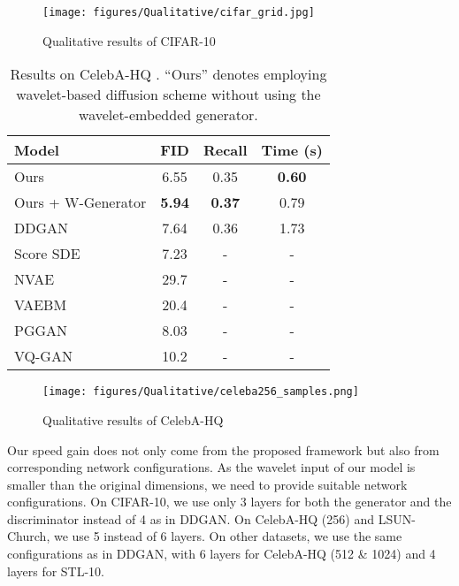 \documentclass[10pt,twocolumn,letterpaper]{article}
\begin{document}
\begin{figure}[t]
  \centering
\texttt{[image: figures/Qualitative/cifar\_grid.jpg]}
    \vspace{-2mm}
   \caption{Qualitative results of CIFAR-10 }
   \label{fig:cifar_samples}
    \vspace{-1mm}
\end{figure}



\begin{table}[t]
  \centering
\begin{tabular}{l c c c}
    \toprule
    Model & FID & Recall & Time (s) \\
    \midrule
    Ours & 6.55 & 0.35 & \textbf{0.60} \\
    Ours + W-Generator & \textbf{5.94} & \textbf{0.37} & 0.79 \\
    DDGAN \cite{xiao2021tackling} & 7.64 & 0.36 & 1.73 \\
    \midrule
    Score SDE \cite{song2020score} & 7.23 & - & - \\
NVAE \cite{vahdat2020nvae} & 29.7 & - & - \\
    VAEBM \cite{xiao2021vaebm} & 20.4 & - & - \\
PGGAN \cite{karras2017progressive} & 8.03 & - & - \\
VQ-GAN \cite{esser2021taming} & 10.2 & - & - \\
\bottomrule
  \end{tabular}
\vspace{-2mm}
  \caption{Results on CelebA-HQ . ``Ours'' denotes employing wavelet-based diffusion scheme without using the wavelet-embedded generator.}
  \label{tab:celeba}
\end{table}

\begin{figure}[t]
  \centering
\texttt{[image: figures/Qualitative/celeba256\_samples.png]}
    \vspace{-6mm}
   \caption{Qualitative results of CelebA-HQ }
   \label{fig:celeb_samples}
    \vspace{-2mm}
\end{figure}

Our speed gain does not only come from the proposed framework but also from corresponding network configurations. As the wavelet input of our model is  smaller than the original dimensions, we need to provide suitable network configurations. On CIFAR-10, we use only 3 layers for both the generator and the discriminator instead of 4 as in DDGAN. On CelebA-HQ (256) and LSUN-Church, we use 5 instead of 6 layers. On other datasets, we use the same configurations as in DDGAN, with 6 layers for CelebA-HQ (512 \& 1024) and 4 layers for STL-10.
\end{document}
